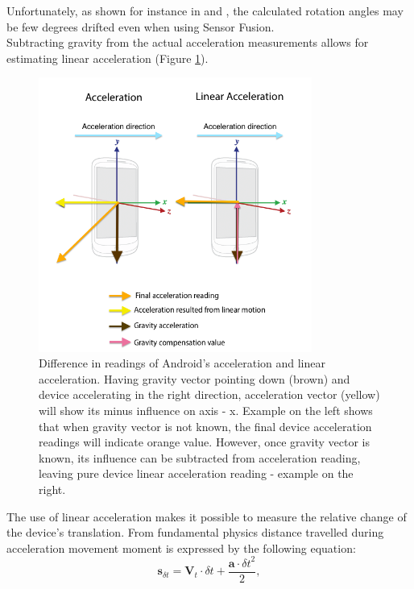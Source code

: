 Unfortunately, as shown for instance in \cite{sensorFusionSmartphones} and \cite{website:extendedSensorFusion}, the calculated rotation angles may be few degrees drifted even when using Sensor Fusion. 
\\
Subtracting gravity from the actual acceleration measurements allows for estimating linear acceleration (Figure \ref{fig:linear_acceleration}). 
\begin{figure}[h!]
    \centering
    \includegraphics[width=0.8\textwidth]{linear_acceleration}
    \caption[Difference in readings of Android's acceleration and linear acceleration]{Difference in readings of Android's acceleration and linear acceleration. Having gravity vector pointing down (brown) and device accelerating in the right direction, acceleration vector (yellow) will show its minus influence on axis - x. Example on the left shows that when gravity vector is not known, the final device acceleration readings will indicate orange value. However, once gravity vector is known, its influence can be subtracted from acceleration reading, leaving pure device linear acceleration reading - example on the right.}
    \label{fig:linear_acceleration}
\end{figure}
The use of linear acceleration makes it possible to measure the relative change of the device's translation. From fundamental physics distance travelled during acceleration movement moment is expressed by the following equation:
\begin{equation} \label{eq:trans_from_accel}
\textbf{s}_{\delta t} = \textbf{V}_{t} \cdot \delta t + \frac{\textbf{a} \cdot {\delta t}^{2}}{2},
\end{equation}
